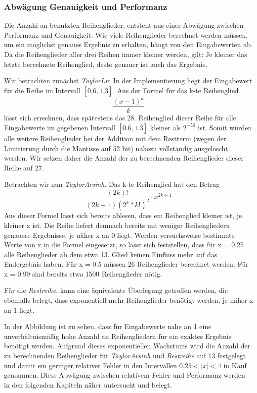 \documentclass[course=erap] {aspdoc}
\begin{document}
    \subsubsection{Abwägung Genauigkeit und Performanz}
    Die Anzahl an benutzten Reihenglieder, entsteht aus einer Abwägung zwischen Performanz und Genauigkeit.
    Wie viele Reihenglieder berechnet werden müssen, um ein möglichst genaues Ergebnis zu erhalten, hängt von den Eingabewerten ab.
    Da die Reihenglieder aller drei Reihen immer kleiner werden, gilt: Je kleiner das letzte berechnete Reihenglied, desto genauer ist auch das Ergebnis.


    Wir betrachten zunächst \textit{TaylorLn}:
    In der Implementierung liegt der Eingabewert für die Reihe im Intervall $[0.\overline{6}, 1.\overline{3}]$.
    Aus der Formel für das k-te Reihenglied
    \[ \frac{(x - 1)^k}{k}
    \]
    lässt sich errechnen, dass spätestens das 28. Reihenglied dieser Reihe für alle Eingabewerte im gegebenen Intervall $[0.\overline{6}, 1.\overline{3}]$ kleiner als $2^{-50}$ ist.
    Somit würden alle weitere Reihenglieder bei der Addition mit dem Restterm (wegen der Limitierung durch die Mantisse auf 52 bit) nahezu vollständig ausgelöscht werden.
    Wir setzen daher die Anzahl der zu berechnenden Reihenglieder dieser Reihe auf 27.

    Betrachten wir nun \textit{TaylorArsinh}.
    Das k-te Reihenglied hat den Betrag
    \[
        \frac{(2k)!}{(2k + 1)(2^k*k!)^2}\cdot x^{2k+1}
    \]
    Aus dieser Formel lässt sich bereits ablesen, dass ein Reihenglied kleiner ist, je kleiner x ist.
    Die Reihe liefert demnach bereits mit weniger Reihengliedern genauere Ergebnisse, je näher x an 0 liegt.
    Werden versuchsweise bestimmte Werte von x in die Formel eingesetzt, so lässt sich feststellen, dass für x = 0.25 alle Reihenglieder ab dem etwa 13. Glied keinen Einfluss mehr auf das Endergebnis haben.
    Für x = 0.5 müssen 26 Reihenglieder berechnet werden.
    Für x = 0.99 sind bereits etwa 1500 Reihenglieder nötig.

    Für die \textit{Restreihe}, kann eine äquivalente Überlegung getroffen werden, die ebenfalls belegt, dass exponentiell mehr Reihenglieder benötigt werden, je näher x an 1 liegt.


    In der Abbildung ist zu sehen, dass für Eingabewerte nahe an 1 eine unverhältnismäßig hohe Anzahl an Reihengliedern für ein exaktes Ergebnis benötigt werden.
    Aufgrund dieses exponentiellen Wachstums wird die Anzahl der zu berechnenden Reihenglieder für \textit{TaylorArsinh} und \textit{Restreihe} auf 13 festgelegt und damit ein geringer relativer Fehler in den Intervallen $0.25<|x|<4$ in Kauf genommen.
    Diese Abwägung zwischen relativem Fehler und Performanz werden in den folgenden Kapiteln näher untersucht und belegt.
\end{document}
